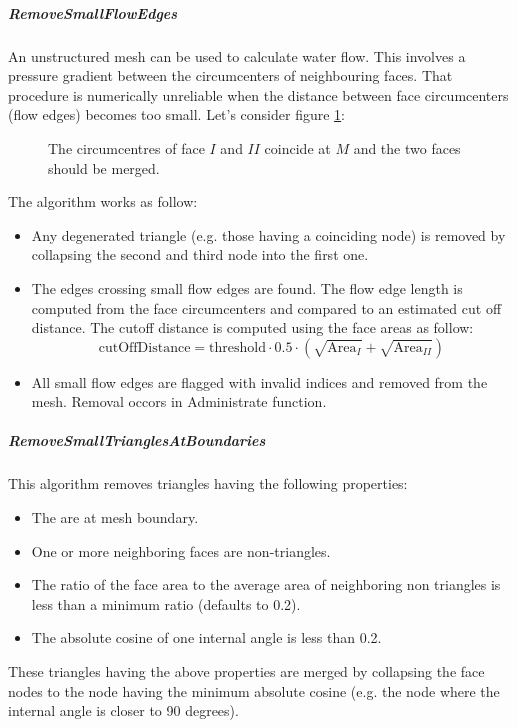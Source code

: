 \documentclass[biblatex]{deltares_manual}
\begin{document}
\subparagraph*{RemoveSmallFlowEdges}
An unstructured mesh can be used to calculate water flow. This involves a pressure gradient between the circumcenters of neighbouring faces. That procedure is numerically unreliable when the distance between face circumcenters (flow edges) becomes too small. Let's consider figure \ref{fig:coincide_circumcenters}:
\begin{figure}[H]
	\begin{center}
		\def\svgwidth{0.45\textwidth}
		\resizebox{0.45\textwidth}{!}{
			
		}
	\end{center}
	\caption{The circumcentres of face $I$ and $II$ coincide at $M$ and the two faces should be merged.}
	\label{fig:coincide_circumcenters}
\end{figure}

The algorithm works as follow:
\begin{itemize}
\item Any degenerated triangle (e.g. those having a coinciding node) is removed by collapsing the second and third node into the first one. 
\item The edges crossing small flow edges are found. The flow edge length is computed from the face circumcenters and compared to an estimated cut off distance.
The cutoff distance is computed using the face areas as follow:
\begin{equation}
	\textrm{cutOffDistance} = \textrm{threshold} \cdot 0.5 \cdot (\sqrt{\textrm{Area}_I}+\sqrt{\textrm{Area}_{II}})
\end{equation}
\item All small flow edges are flagged with invalid indices and removed from the mesh. Removal occors in Administrate function.
\end{itemize}

\subparagraph*{RemoveSmallTrianglesAtBoundaries}
This algorithm removes triangles having the following properties:
\begin{itemize}
\item The are at mesh boundary.	
\item One or more neighboring faces are non-triangles.
\item The ratio of the face area to the average area of neighboring non triangles is less than a minimum ratio (defaults to 0.2).
\item The absolute cosine of one internal angle is less than 0.2.
\end{itemize}
These triangles having the above properties are merged by collapsing the face nodes to the node having the minimum absolute cosine (e.g. the node where the internal angle is closer to 90 degrees). 
\end{document}
